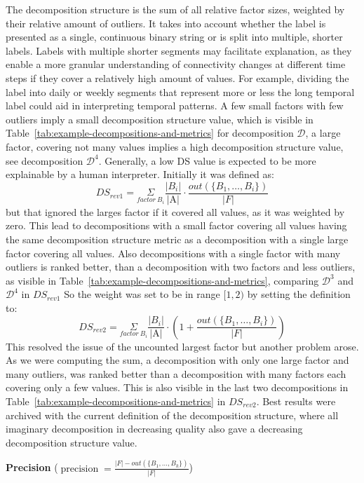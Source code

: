 The decomposition structure is the sum of all relative factor sizes, weighted by their relative amount of outliers.
It takes into account whether the label is presented as a single, continuous binary string or is split into multiple, shorter labels.
Labels with multiple shorter segments may facilitate explanation, as they enable a more granular understanding of connectivity changes at different time steps if they cover a relatively high amount of values.
For example, dividing the label into daily or weekly segments that represent more or less the long temporal label could aid in interpreting temporal patterns.
A few small factors with few outliers imply a small decomposition structure value, which is visible in Table~\ref{tab:example-decompositions-and-metrics} for decomposition $\mathcal{D}$, a large factor, covering not many values implies a high decomposition structure value, see decomposition $\mathcal{D}^4$.
Generally, a low DS value is expected to be more explainable by a human interpreter.
Initially it was defined as:
$$DS_{rev1} = \underset{factor~ B_i}{\Sigma}\frac{|B_i|}{\text{|A|}} \cdot \frac{out(\{B_1,\dots,B_i\})}{|F|}$$
but that ignored the larges factor if it covered all values, as it was weighted by zero.
This lead to decompositions with a small factor covering all values having the same decomposition structure metric as a decomposition with a single large factor covering all values.
Also decompositions with a single factor with many outliers is ranked better, than a decomposition with two factors and less outliers, as visible in Table~\ref{tab:example-decompositions-and-metrics}, comparing $\mathcal{D}^3$ and $\mathcal{D}^4$ in $DS_{rev1}$
So the weight was set to be in range $[1,2)$ by setting the definition to:
$$DS_{rev2} = \underset{factor~ B_i}{\Sigma}\frac{|B_i|}{\text{|A|}} \cdot (1 + \frac{out(\{B_1,\dots,B_i\})}{|F|})$$
This resolved the issue of the uncounted largest factor but another problem arose.
As we were computing the sum, a decomposition with only one large factor and many outliers, was ranked better than a decomposition with many factors each covering only a few values.
This is also visible in the last two decompositions in Table~\ref{tab:example-decompositions-and-metrics} in $DS_{rev2}$.
Best results were archived with the current definition of the decomposition structure, where all imaginary decomposition in decreasing quality also gave a decreasing decomposition structure value.

\textbf{Precision} ($\operatorname{precision} = \frac{|F| - out(\{B_1,\dots,B_k\})}{|F|}$)

